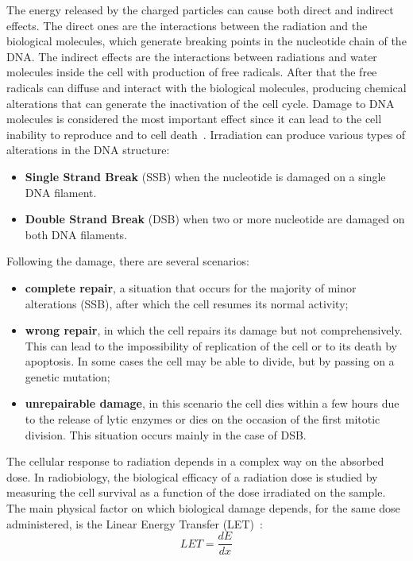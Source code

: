 \noindent The energy released by the charged particles can cause both direct and indirect effects.
The direct ones are the interactions between the radiation and the biological molecules,
which generate breaking points in the nucleotide chain of the DNA.
The indirect effects are the interactions between radiations and water molecules inside the cell with production of free radicals.
After that the free radicals can diffuse and interact with the biological molecules, producing chemical alterations that can generate the inactivation of the cell cycle.
Damage to DNA molecules is considered the most important effect since it can lead to the cell inability to reproduce and to cell death~\cite{cells}.
\newline
Irradiation can produce various types of alterations in the DNA structure:
\begin{itemize}
	\item \textbf{Single Strand Break} (SSB) when the nucleotide is damaged on a single DNA filament.
	\item \textbf{Double Strand Break} (DSB) when two or more nucleotide are damaged on both DNA filaments. 
\end{itemize}
Following the damage, there are several scenarios:
\begin{itemize}
	\item \textbf{complete repair}, a situation that occurs for the majority of minor alterations (SSB), after which the cell resumes its normal activity;
	\item \textbf{wrong repair}, in which the cell repairs its damage but not comprehensively. This can lead to the impossibility of replication of the cell or to its death by apoptosis. In some cases the cell may be able to divide, but by passing on a genetic mutation;
	\item \textbf{unrepairable damage}, in this scenario the cell dies within a few hours due to the release of lytic enzymes or dies on the occasion of the first mitotic division. This situation occurs mainly in the case of DSB.
\end{itemize}
The cellular response to radiation depends in a complex way on the absorbed dose.
In radiobiology, the biological efficacy of a radiation dose is studied by measuring the cell survival as a function of the dose irradiated on the sample. The main physical factor on which biological damage depends, for the same dose administered, is the Linear Energy Transfer (LET)~\cite{let}:   
\begin{equation}\label{eq:let}
	LET=\frac{dE}{dx}
\end{equation}
